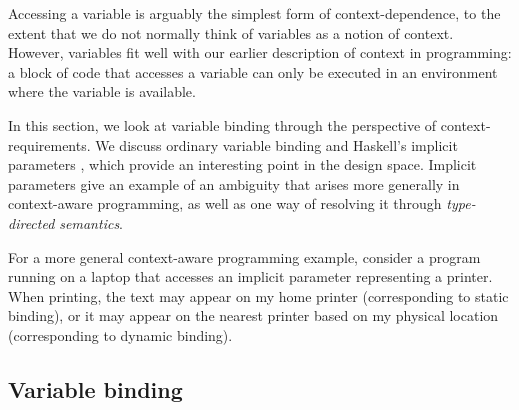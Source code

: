 Accessing a variable is arguably the simplest form of context-dependence, to the extent that we
do not normally think of variables as a notion of context. However, variables fit well with our
earlier description of context in programming: a block of code that accesses a variable can only
be executed in an environment where the variable is available.

In this section, we look at variable binding through the perspective of context-requirements.
We discuss ordinary variable binding and Haskell's implicit parameters \cite{app-implicit-parameters},
which provide an interesting point in the design space. Implicit parameters give an example of
an ambiguity that arises more generally in context-aware programming, as well as one way of
resolving it through \emph{type-directed semantics}.

For a more general context-aware programming example, consider a program
running on a laptop that accesses an implicit parameter representing a printer. When printing, the
text may appear on my home printer (corresponding to static binding), or it may appear on the
nearest printer based on my physical location (corresponding to dynamic binding).


\subsection{Variable binding}
\label{sec:path-binding-var}


